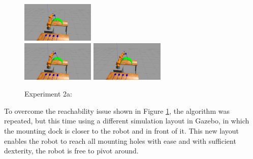 \begin{center}
\begin{figure}[H]
\includegraphics[width=0.31\textwidth]{images/robot_planner2/robot_planner2_6}\\
\includegraphics[width=0.31\textwidth]{images/robot_planner2/robot_planner2_7}
\includegraphics[width=0.31\textwidth]{images/robot_planner2/robot_planner2_8}\\
\caption{Experiment 2a:}
\label{experiment-robot-planner2a}
\end{figure}
\end{center}

To overcome the reachability issue shown in Figure \ref{experiment-robot-planner2a}, the algorithm was repeated, but this time using a different simulation layout 
in Gazebo, in which the mounting dock is closer to the robot and in front of it. This new layout enables the robot to reach all mounting holes with ease and 
with sufficient dexterity, the robot is free to pivot around.

